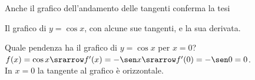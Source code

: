 \begin{osservazione}
Anche il grafico dell'andamento delle tangenti conferma la tesi\\
\begin{inaccessibleblock}
\end{inaccessibleblock}
\label{}
\begin{center} Il grafico di \(y = \cos x\), con alcune sue tangenti, e 
la sua derivata.\end{center}
\end{osservazione}

% 

\begin{esempio}
Quale pendenza ha il grafico di \(y=\cos x\) per \(x=0\)?\\
\(f(x)= \cos x \srarrow f'(x)=-\sen x\srarrow f'(0)=-\sen 0=0\).\\
In \(x=0\) la tangente al grafico è orizzontale.
\end{esempio} 

